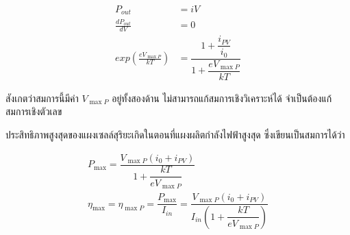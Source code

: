 \documentclass[a4paper,nobib,openany]{tufte-book}
\begin{document}
\begin{align}
\label{eq:orgb7bf346}
  P_{out} &= i V \nonumber \\
  \frac{dP_{out}}{dV} &= 0 \nonumber \\
  exp \left(\frac{e V_{\max P}}{kT} \right) &= \dfrac{1+\dfrac{i_{PV}}{i_0}}{1+ \dfrac{e V_{\max P}}{kT}}
\end{align}

สังเกตว่าสมการนี้มีค่า \(V_{\max P}\) อยู่ทั้งสองด้าน
ไม่สามารถแก้สมการเชิงวิเคราะห์ได้ จำเป็นต้องแก้สมการเชิงตัวเลข

ประสิทธิภาพสูงสุดของแผงเซลล์สุริยะเกิดในตอนที่แผงผลิตกำลังไฟฟ้าสูงสุด
ซึ่งเขียนเป็นสมการได้ว่า

\begin{gather*}
\label{eq:orge17486e}
  P_{\max} =  \dfrac{V_{\max P} ( i_0 + i_{PV} )}{1 + \dfrac{kT}{e V_{\max P}}} \\
  \eta_{\max} = \eta_{\max P} =  \dfrac{P_{\max}}{I_{in}} = \dfrac{V_{\max P} ( i_0 + i_{PV} )}{I_{in} \left(1 + \dfrac{kT}{e V_{\max P}} \right)}
\end{gather*}
\end{document}
